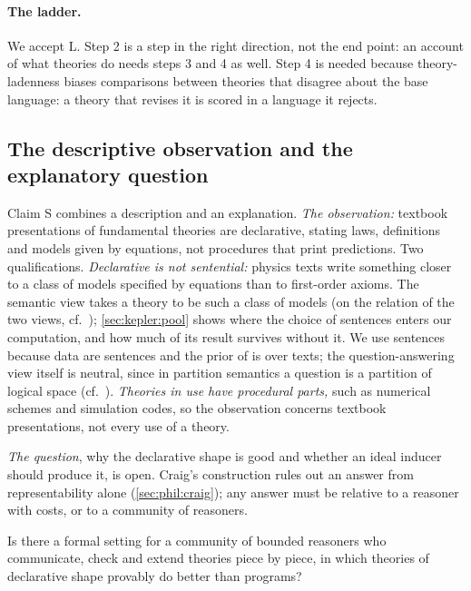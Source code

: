 \paragraph{The ladder.}
We accept L. Step 2 is a step in the right direction, not the end point: an account of what theories do needs steps 3 and 4 as well. Step 4 is needed because theory-ladenness \citep{hanson1958patterns} biases comparisons between theories that disagree about the base language: a theory that revises it is scored in a language it rejects.

\subsection{The descriptive observation and the explanatory question}\label{sec:phil:observation}

Claim S combines a description and an explanation. \emph{The observation:} textbook presentations of fundamental theories are declarative, stating laws, definitions and models given by equations, not procedures that print predictions. Two qualifications. \emph{Declarative is not sentential:} physics texts write something closer to a class of models specified by equations \citep{suppes1960comparison,suppes1962models} than to first-order axioms. The semantic view takes a theory to be such a class of models (on the relation of the two views, cf.\ \citealp{halvorson2012what,lutz2017what}); \cref{sec:kepler:pool} shows where the choice of sentences enters our computation, and how much of its result survives without it. We use sentences because data are sentences and the prior of \SAIabbr is over texts; the question-answering view itself is neutral, since in partition semantics a question is a partition of logical space (cf.\ \citealp{groenendijk1984studies}). \emph{Theories in use have procedural parts,} such as numerical schemes and simulation codes, so the observation concerns textbook presentations, not every use of a theory.

\emph{The question}, why the declarative shape is good and whether an ideal inducer should produce it, is open. Craig's construction rules out an answer from representability alone (\cref{sec:phil:craig}); any answer must be relative to a reasoner with costs, or to a community of reasoners.

\begin{question}\label{q:phil:declarative}
Is there a formal setting for a community of bounded reasoners who communicate, check and extend theories piece by piece, in which theories of declarative shape provably do better than programs?
\end{question}

